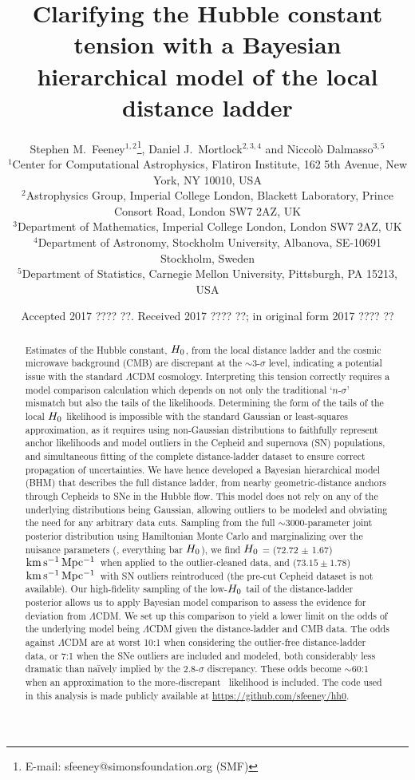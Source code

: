 \documentclass[a4paper,fleqn,usenatbib]{mnras}
\title[Hierarchical $\hubble$]
  {Clarifying the Hubble constant tension with a Bayesian 
  hierarchical model of the local distance ladder}
\author[S.\ M. Feeney et al.]{
Stephen M.\ Feeney$^{1,2}$\thanks{E-mail: sfeeney@simonsfoundation.org (SMF)},
Daniel J.\ Mortlock$^{2,3,4}$
and Niccol\`{o} Dalmasso$^{3,5}$
\\
$^1$Center for Computational Astrophysics, Flatiron Institute, 162 5th Avenue, New York, NY 10010, USA \\
$^2$Astrophysics Group, Imperial College London, Blackett Laboratory, Prince Consort Road, London SW7 2AZ, UK \\
$^3$Department of Mathematics, Imperial College London, London SW7 2AZ, UK \\
$^4$Department of Astronomy, Stockholm University, Albanova, SE-10691 Stockholm, Sweden \\
$^5$Department of Statistics, Carnegie Mellon University, Pittsburgh, PA 15213, USA
}
\date{Accepted 2017 ???? ??. 
  Received 2017 ???? ??; 
  in original form 2017 ???? ??}
\newcommand{\kmsmpc}{\ensuremath{{\rm km\,s^{-1}\,Mpc^{-1}}}}
\begin{document}
\label{firstpage}
\pagerange{\pageref{firstpage}--\pageref{lastpage}}
\maketitle

\begin{abstract}
Estimates of the Hubble constant, $\hubble$, from the local distance ladder and the cosmic microwave background (CMB) are discrepant at the $\sim$3-$\sigma$ level, indicating a potential issue with the standard $\Lambda$CDM cosmology. Interpreting this tension correctly requires a model comparison calculation which depends on not only the traditional `$n$-$\sigma$' mismatch but also the tails of the likelihoods. Determining the form of the tails of the local $\hubble$ likelihood is impossible with the standard Gaussian or least-squares approximation, as it requires using non-Gaussian distributions to faithfully represent anchor likelihoods and model outliers in the Cepheid and supernova (SN) populations, and simultaneous fitting of the complete distance-ladder dataset to ensure correct propagation of uncertainties. We have hence developed a Bayesian hierarchical model (BHM) that describes the full distance ladder, from nearby geometric-distance anchors through Cepheids to SNe in the Hubble flow. This model does not rely on any of the underlying distributions being Gaussian, allowing outliers to be modeled and obviating the need for any arbitrary data cuts. Sampling from the full $\sim$3000-parameter joint posterior distribution using Hamiltonian Monte Carlo and marginalizing over the nuisance parameters (\ie, everything bar $\hubble$), we find $\hubble$ = (72.72 $\pm$ 1.67) \kmsmpc\ when applied to the outlier-cleaned \cite{Riess_etal:2016} data, and ($73.15 \pm 1.78$) \kmsmpc\ with SN outliers reintroduced (the pre-cut Cepheid dataset is not available). Our high-fidelity sampling of the low-$\hubble$ tail of the distance-ladder posterior allows us to apply Bayesian model comparison to assess the evidence for deviation from $\Lambda$CDM. We set up this comparison to yield a lower limit on the odds of the underlying model being $\Lambda$CDM given the distance-ladder and \citet{Planck_XIII:2016} CMB data. The odds against $\Lambda$CDM are at worst 10:1 when considering the outlier-free distance-ladder data, or 7:1 when the SNe outliers are included and modeled, both considerably less dramatic than na\"ively implied by the $2.8$-$\sigma$ discrepancy. These odds become $\sim$60:1 when an approximation to the more-discrepant~\citet{Planck_Int_XLVI:2016} likelihood is included. The code used in this analysis is made publicly available at \url{https://github.com/sfeeney/hh0}.
\end{abstract}
\end{document}

